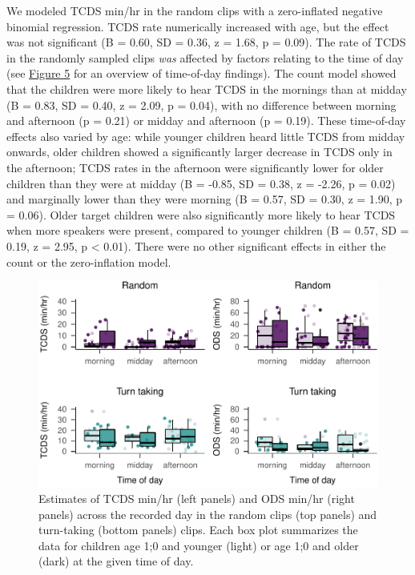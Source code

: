 \documentclass[floatsintext,man]{apa6}
\theoremstyle{definition}
\theoremstyle{definition}
\theoremstyle{definition}
\theoremstyle{remark}
\begin{document}
We modeled TCDS min/hr in the random clips with a zero-inflated negative
binomial regression. TCDS rate numerically increased with age, but the
effect was not significant (B = 0.60, SD = 0.36, z = 1.68, p = 0.09).
The rate of TCDS in the randomly sampled clips \emph{was} affected by
factors relating to the time of day (see \protect\hyperlink{fig5}{Figure
5} for an overview of time-of-day findings). The count model showed that
the children were more likely to hear TCDS in the mornings than at
midday (B = 0.83, SD = 0.40, z = 2.09, p = 0.04), with no difference
between morning and afternoon (p = 0.21) or midday and afternoon (p =
0.19). These time-of-day effects also varied by age: while younger
children heard little TCDS from midday onwards, older children showed a
significantly larger decrease in TCDS only in the afternoon; TCDS rates
in the afternoon were significantly lower for older children than they
were at midday (B = -0.85, SD = 0.38, z = -2.26, p = 0.02) and
marginally lower than they were morning (B = 0.57, SD = 0.30, z = 1.90,
p = 0.06). Older target children were also significantly more likely to
hear TCDS when more speakers were present, compared to younger children
(B = 0.57, SD = 0.19, z = 2.95, p \textless{} 0.01). There were no other
significant effects in either the count or the zero-inflation model.

\begin{figure}
\centering
\includegraphics{Tseltal-CLE_files/figure-latex/fig5-1.pdf}
\caption{\label{fig:fig5}Estimates of TCDS min/hr (left panels) and ODS
min/hr (right panels) across the recorded day in the random clips (top
panels) and turn-taking (bottom panels) clips. Each box plot summarizes
the data for children age 1;0 and younger (light) or age 1;0 and older
(dark) at the given time of day.}
\end{figure}
\end{document}
